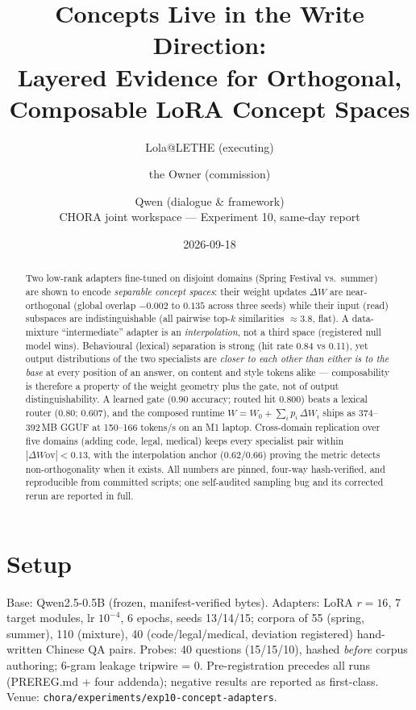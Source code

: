 \documentclass[11pt, a4paper]{article}
\title{\textbf{Concepts Live in the Write Direction:\\Layered Evidence for Orthogonal, Composable LoRA Concept Spaces}}
\author{Lola@LETHE (executing) \and the Owner (commission) \and Qwen (dialogue \& framework)\\[2pt]
\small CHORA joint workspace --- Experiment 10, same-day report}
\date{2026-09-18}
\begin{document}
\maketitle

\begin{abstract}
Two low-rank adapters fine-tuned on disjoint domains (Spring Festival vs.\ summer) are
shown to encode \emph{separable concept spaces}: their weight updates $\Delta W$ are
near-orthogonal (global overlap $-0.002$ to $0.135$ across three seeds) while their input
(read) subspaces are indistinguishable (all pairwise top-$k$ similarities
$\approx 3.8$, flat). A data-mixture ``intermediate'' adapter is an \emph{interpolation},
not a third space (registered null model wins). Behavioural (lexical) separation is
strong (hit rate 0.84 vs 0.11), yet output distributions of the two specialists are
\emph{closer to each other than either is to the base} at every position of an answer,
on content and style tokens alike --- composability is therefore a property of the
weight geometry plus the gate, not of output distinguishability. A learned gate
(0.90 accuracy; routed hit 0.800) beats a lexical router (0.80; 0.607), and the composed
runtime $W=W_0+\sum_i p_i\,\Delta W_i$ ships as 374--392\,MB GGUF at 150--166 tokens/s on
an M1 laptop. Cross-domain replication over five domains (adding code, legal, medical)
keeps every specialist pair within $|\Delta W\text{ov}|<0.13$, with the interpolation
anchor ($0.62$/$0.66$) proving the metric detects non-orthogonality when it exists.
All numbers are pinned, four-way hash-verified, and reproducible from committed scripts;
one self-audited sampling bug and its corrected rerun are reported in full.
\end{abstract}

\section{Setup}
Base: Qwen2.5-0.5B (frozen, manifest-verified bytes). Adapters: LoRA $r{=}16$, 7 target
modules, lr $10^{-4}$, 6 epochs, seeds 13/14/15; corpora of 55 (spring, summer), 110
(mixture), 40 (code/legal/medical, deviation registered) hand-written Chinese QA pairs.
Probes: 40 questions (15/15/10), hashed \emph{before} corpus authoring; 6-gram leakage
tripwire = 0. Pre-registration precedes all runs (PREREG.md + four addenda); negative
results are reported as first-class. Venue: \texttt{chora/experiments/exp10-concept-adapters}.
\end{document}
